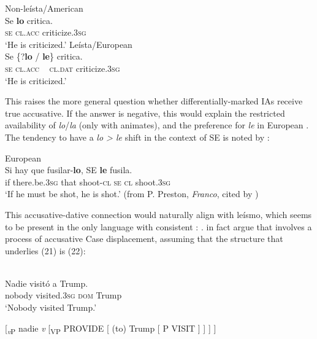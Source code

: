 \documentclass[output=paper]{langsci/langscibook}
\begin{document}
\ea%
    \ea
    Non-leísta/American \label{ex:gallego:19}\\
    \gll Se  \textbf{lo}       critica.          \\
              \textsc{se}  \textsc{cl.acc} criticize\textsc{{}.3}\textsc{sg}\\
    \glt      ‘He is criticized.’
    \ex Leísta/European \\
    \gll Se \{?\textbf{lo}    /    \textbf{le}\}       critica.      \\
                 \textsc{se}   \textsc{cl.acc} ~ \textsc{cl.dat}   criticize\textsc{{}.3}\textsc{sg}\\
    \glt      ‘He is criticized.’
    \z
\z   

This raises the more general question whether differentially-marked IAs receive true accusative. If the answer is negative, this would explain the restricted availability of \textit{lo}/\textit{la} (only with animates), and the preference for \textit{le} in European . The tendency to have a \textit{lo > le} shift in the context of SE is noted by \citet{Ordóñez2004}:

\ea%
    European \label{ex:gallego:20}\\
    \gll Si hay                 que  fusilar-\textbf{lo},  SE \textbf{le} fusila.\\
        if  there.be\textsc{{}.3}\textsc{sg}  that  shoot\textsc{{}-cl}  \textsc{se}  \textsc{cl}  shoot\textsc{{}.3}\textsc{sg}\\
    \glt ‘If he must be shot, he is shot.’ (from P. Preston, \textit{Franco}, cited by \citealt{Ordóñez2004})
    \z

This accusative-dative connection would naturally align with leísmo, which seems to be present in the only  language with consistent \DOM: . \citet{Colomina2017} in fact argue that \DOM involves a process of accusative Case displacement, assuming that the structure that underlies (21) is (22):

\ea%
    \label{ex:gallego:21}\\
    \gll Nadie    visitó             a          Trump.   \\
         nobody  visited\textsc{{}.3}\textsc{sg}  \textsc{dom}   Trump\\
    \glt ‘Nobody visited Trump.’
    \z

\ea%
    \label{ex:gallego:22}
    [\textit{\textsubscript{v}}\textsubscript{P} nadie \textit{v} [\textsubscript{VP} PROVIDE [ (to) Trump [ P VISIT ] ] ] ]
\z
\end{document}
